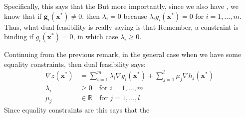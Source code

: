 Specifically, this says that the  But more importantly, since we also have , we know that if $\mathbf{g}_i(\mathbf{x}^*) \neq 0$, then $\lambda_i = 0$ because $\lambda_i g_i(\mathbf{x}^*) = 0$ for $i = 1,\dots,m$. Thus, what dual feasibility is really saying is that  Remember, a constraint is binding if $g_i(\mathbf{x}^*) = 0$, in which case $\lambda_i \geq 0$.


\begin{remark} Continuing from the previous remark, in the general case when we have some equality constraints, then dual feasibility says:
\begin{displaymath}
\begin{aligned}
\nabla z(\mathbf{x}^*) &= \sum_{i = 1}^m\lambda_i \nabla g_i(\mathbf{x}^*) + \sum_{j = 1}^{l}\mu_j \nabla h_j(\mathbf{x}^*)\\
\lambda_i &\geq 0 \quad \text{for $i=1,\dots,m$}\\
\mu_j &\in \mathbb{R}\quad \text{for $j=1,\dots,l$}
\end{aligned}
\end{displaymath}
Since equality constraints are  this says that the  
\end{remark}

